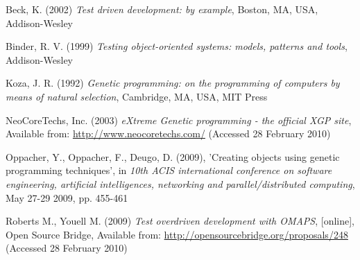 \documentclass[a4paper]{article}
\begin{document}
\begin{thebibliography}{}

  Beck, K. (2002)
  \emph{Test driven development: by example},
  Boston, MA, USA, Addison-Wesley

  Binder, R. V. (1999)
  \emph{Testing object-oriented systems: models, patterns and tools},
  Addison-Wesley

  Koza, J. R. (1992)
  \emph{Genetic programming: on the programming of
    computers by means of natural selection},
  Cambridge, MA, USA, MIT Press

  NeoCoreTechs, Inc. (2003)
  \emph{eXtreme Genetic programming - the official XGP site},
  Available from: \url{http://www.neocoretechs.com/} (Accessed 28 February 2010)

  Oppacher, Y., Oppacher, F., Deugo, D. (2009),
  'Creating objects using genetic programming techniques',
  in \emph{10th ACIS international conference on software engineering,
    artificial intelligences, networking and parallel/distributed
    computing},
  May 27-29 2009, pp. 455-461

  Roberts M., Youell M. (2009)
  \emph{Test overdriven development with OMAPS},
  [online], Open Source Bridge, Available from:  \url{http://opensourcebridge.org/proposals/248} (Accessed 28 February
2010)

\end{thebibliography}
\end{document}
